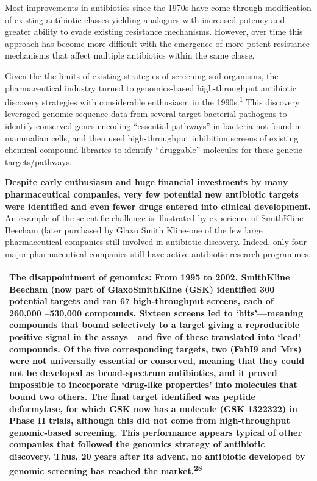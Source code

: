 \documentclass[
  11pt,
  paper=a4,
  ,captions=tableheading
]{scrartcl}
\begin{document}
Most improvements in antibiotics since the 1970s have come through
modification of existing antibiotic classes yielding analogues with
increased potency and greater ability to evade existing resistance
mechanisms. However, over time this approach has become more difficult
with the emergence of more potent resistance mechanisms that affect
multiple antibiotics within the same classe.

Given the the limits of existing strategies of screening soil organisms,
the pharmaceutical industry turned to genomics-based high-throughput
antibiotic discovery strategies with considerable enthusiasm in the
1990s.\textsuperscript{1} This discovery leveraged genomic sequence data
from several target bacterial pathogens to identify conserved genes
encoding ``essential pathways'' in bacteria not found in mammalian
cells, and then used high-throughput inhibition screens of existing
chemical compound libraries to identify ``druggable'' molecules for
these genetic targets/pathways.

\textbf{Despite early enthusiasm and huge financial investments by many
pharmaceutical companies, very few potential new antibiotic targets were
identified and even fewer drugs entered into clinical development.} An
example of the scientific challenge is illustrated by experience of
SmithKline Beecham (later purchased by Glaxo Smith Kline-one of the few
large pharmaceutical companies still involved in antibiotic discovery.
Indeed, only four major pharmaceutical companies still have active
antibiotic research programmes.

\begin{longtable}[]{@{}
  >{\raggedright\arraybackslash}p{}@{}}
\toprule
\endhead
\textbf{The disappointment of genomics:} From 1995 to 2002, SmithKline
Beecham (now part of GlaxoSmithKline (GSK) identified 300 potential
targets and ran 67 high-throughput screens, each of 260,000 --530,000
compounds. Sixteen screens led to `hits'---meaning compounds that bound
selectively to a target giving a reproducible positive signal in the
assays---and five of these translated into `lead' compounds. Of the five
corresponding targets, two (FabI9 and Mrs) were not universally
essential or conserved, meaning that they could not be developed as
broad-spectrum antibiotics, and it proved impossible to incorporate
`drug-like properties' into molecules that bound two others. The final
target identified was peptide deformylase, for which GSK now has a
molecule (GSK 1322322) in Phase II trials, although this did not come
from high-throughput genomic-based screening. This performance appears
typical of other companies that followed the genomics strategy of
antibiotic discovery. Thus, 20 years after its advent, no antibiotic
developed by genomic screening has reached the
market.\textsuperscript{28} \\
\bottomrule
\end{longtable}
\end{document}
